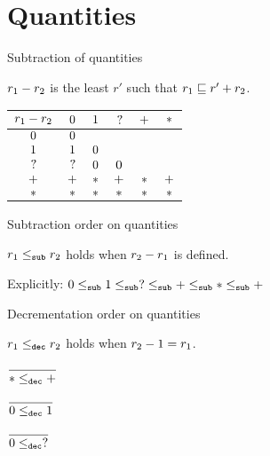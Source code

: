 \section{Quantities}

\begin{frame}{Subtraction of quantities}

$r_1 - r_2$ is the least $r'$ such that $r_1 \sqsubseteq r' + r_2$.

\vspace{2em}

\begin{table}[ht]
  \centering
  \begin{tabular}{|c|c|c|c|c|c|}
  \hline
  $r_1 - r_2$ & $0$ & $1$  & $?$  & $+$ & $*$  \\ \hline
  $0$             & $0$ &         &         &         &         \\ \hline
  $1$              & $1$  & $0$ &         &         &         \\ \hline
  $?$              & $?$  & $0$ & $0$ &         &         \\ \hline
  $+$             & $+$ & $*$  & $+$ & $*$  & $+$ \\ \hline
  $*$              & $*$  & $*$  & $*$  & $*$  & $*$  \\ \hline
  \end{tabular}
\end{table}

\end{frame}

\begin{frame}{Subtraction order on quantities}

$r_1 \leq_{\texttt{sub}} r_2$ holds when $r_2 - r_1$ is defined.

\vspace{2em}

Explicitly: $0 \leq_{\texttt{sub}} 1 \leq_{\texttt{sub}} ? \leq_{\texttt{sub}} + \leq_{\texttt{sub}} * \leq_{\texttt{sub}} +$

\end{frame}

\begin{frame}{Decrementation order on quantities}

$r_1 \leq_{\texttt{dec}} r_2$ holds when $r_2 - 1 = r_1$.

\begin{center}
  $\infrule{}{\ledecqty{\Any}{\Many}}$

  \vspace{2em}

  $\infrule{}{\ledecqty{\Zero}{\One}}$

  \vspace{2em}

  $\infrule{}{\ledecqty{\Zero}{\Few}}$
\end{center}

\end{frame}

